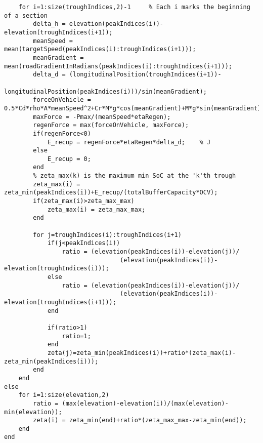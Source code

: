 \documentclass[ExampleMasters.tex]{subfiles}
\begin{document}
\begin{verbatim}
    for i=1:size(troughIndices,2)-1     % Each i marks the beginning of a section
        delta_h = elevation(peakIndices(i))-elevation(troughIndices(i+1));
        meanSpeed = mean(targetSpeed(peakIndices(i):troughIndices(i+1)));
        meanGradient = mean(roadGradientInRadians(peakIndices(i):troughIndices(i+1)));
        delta_d = (longitudinalPosition(troughIndices(i+1))-
                            longitudinalPosition(peakIndices(i)))/sin(meanGradient);
        forceOnVehicle = 0.5*Cd*rho*A*meanSpeed^2+Cr*M*g*cos(meanGradient)+M*g*sin(meanGradient);
        maxForce = -Pmax/(meanSpeed*etaRegen);
        regenForce = max(forceOnVehicle, maxForce);
        if(regenForce<0)
            E_recup = regenForce*etaRegen*delta_d;    % J
        else
            E_recup = 0;
        end
        % zeta_max(k) is the maximum min SoC at the 'k'th trough
        zeta_max(i) = zeta_min(peakIndices(i))+E_recup/(totalBufferCapacity*OCV);
        if(zeta_max(i)>zeta_max_max)
            zeta_max(i) = zeta_max_max;
        end
        
        for j=troughIndices(i):troughIndices(i+1)
            if(j<peakIndices(i))
                ratio = (elevation(peakIndices(i))-elevation(j))/
                                (elevation(peakIndices(i))-elevation(troughIndices(i)));
            else
                ratio = (elevation(peakIndices(i))-elevation(j))/
                                (elevation(peakIndices(i))-elevation(troughIndices(i+1)));
            end
            
            if(ratio>1)
                ratio=1;
            end
            zeta(j)=zeta_min(peakIndices(i))+ratio*(zeta_max(i)-zeta_min(peakIndices(i)));
        end
    end
else
    for i=1:size(elevation,2)
        ratio = (max(elevation)-elevation(i))/(max(elevation)-min(elevation));
        zeta(i) = zeta_min(end)+ratio*(zeta_max_max-zeta_min(end));
    end
end
        \end{verbatim}
    \newpage
\end{document}
